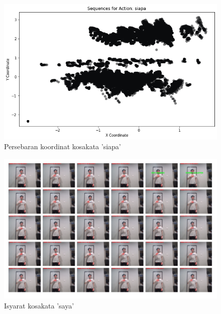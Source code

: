 \begin{figure}[H]
  \centering

  \includegraphics[scale=0.7]{gambar/coor-siapa.png}

  \caption{Persebaran koordinat kosakata 'siapa'}
  \label{fig:isyarat-coor-siapa}
\end{figure}

\begin{figure}[H]
  \centering

  \includegraphics[scale=0.7]{gambar/isyarat-saya.png}

  \caption{Isyarat kosakata 'saya'}
  \label{fig:isyarat-saya}
\end{figure}

